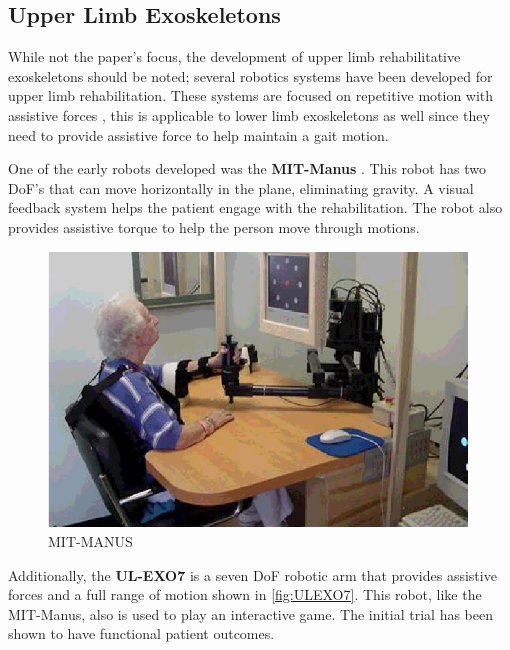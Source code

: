 \subsection{Upper Limb Exoskeletons}
While not the paper's focus,  the development of upper limb rehabilitative exoskeletons should be noted; several robotics systems have been developed for upper limb rehabilitation. These systems are focused on repetitive motion with assistive forces \cite{rehmat2018upper} \cite{krebs2013rehabilitation}, this is applicable to lower limb exoskeletons as well since they need to provide assistive force to help maintain a gait motion. 

One of the early robots developed was the \textbf{MIT-Manus} \cite{krebs2004rehabilitation}. This robot has two DoF's that can move horizontally in the plane, eliminating gravity. A visual feedback system helps the patient engage with the rehabilitation. The robot also provides assistive torque to help the person move through motions.    

\begin{figure}
    \centering
    \includegraphics[scale=0.5]{images/background/MIT-MANUS.png}
    \caption[MIT-MANUS]{MIT-MANUS \cite{MIT-Manus}}
    \label{fig:my_label}
\end{figure}


Additionally, the \textbf{UL-EXO7} is a seven DoF robotic arm that provides assistive forces and a full range of motion shown in \autoref{fig:ULEXO7}. This robot, like the MIT-Manus, also is used to play an interactive game. The initial trial has been shown to have functional patient outcomes. 

